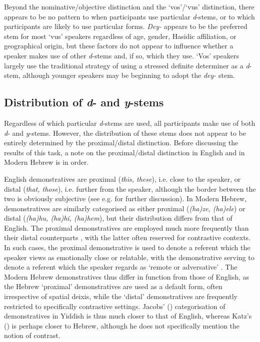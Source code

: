 \documentclass[output=paper, hidelinks]{langscibook}
\begin{document}
Beyond the nominative/objective distinction and the `vos'/`vus' distinction, there appears to be no pattern to when participants use particular \textit{d}-stems, or to which participants are likely to use particular forms. \textit{Dey-} appears to be the preferred stem for most `vus' speakers regardless of age, gender, Hasidic affiliation, or geographical origin, but these factors do not appear to influence whether a speaker makes use of other \textit{d}-stems and, if so, which they use. `Vos' speakers largely use the traditional strategy of using a stressed definite determiner as a \textit{d}-stem, although younger speakers may be beginning to adopt the \textit{dey-} stem. 




\subsection{Distribution of \textit{d}- and \textit{y}-stems}\label{sec:dvsy}

Regardless of which particular \textit{d}-stems are used, all participants make use of both \textit{d}- and \textit{y}-stems. However, the distribution of these stems does not appear to be entirely determined by the proximal/distal distinction. Before discussing the results of this task, a note on the proximal/distal distinction in English and in Modern Hebrew is in order.

English demonstratives are proximal (\textit{this, these}), i.e. close to the speaker, or distal (\textit{that, those}), i.e. further from the speaker, although the border between the two is obviously subjective (see e.g. \citet{Stirling02} for further discussion). In Modern Hebrew, demonstratives are similarly categorised as either proximal (\textit{(ha)ze, (ha)ele}) or distal (\textit{(ha)hu, (ha)hi, (ha)hem}), but their distribution differs from that of English. The proximal demonstratives are employed much more frequently than their distal counterparts \citep{Halevy13}, with the latter often reserved for contrastive contexts. In such cases, the proximal demonstrative is used to denote a referent which the speaker views as emotionally close or relatable, with the demonstrative serving to denote a referent which the speaker regards as ‘remote or adversative’ \citep{Halevy13}. The Modern Hebrew demonstratives thus differ in function from those of English, as the Hebrew ‘proximal’ demonstratives are used as a default form, often irrespective of spatial deixis, while the ‘distal’ demonstratives are frequently restricted to specifically contrastive settings. Jacobs' (\citeyear{Jacobs05}) categorisation of demonstratives in Yiddish is thus much closer to that of English, whereas Katz's (\citeyear{Katz87}) is perhaps closer to Hebrew, although he does not specifically mention the notion of contrast.
\end{document}
